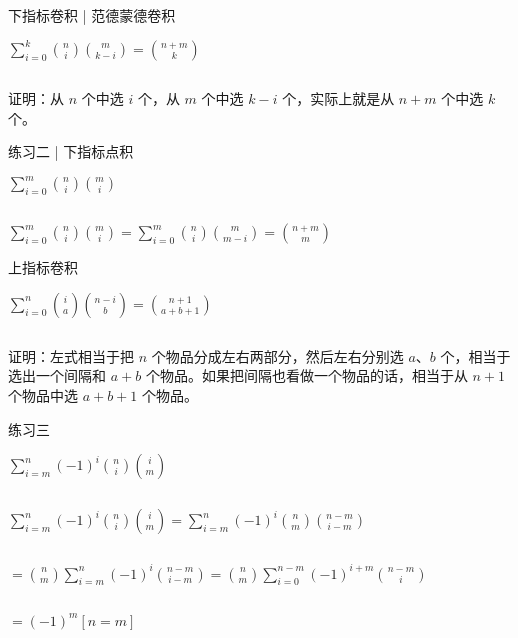 \documentclass{beamer}
\begin{document}
\begin{frame}{下指标卷积 | 范德蒙德卷积}

    $\sum\limits_{i = 0} ^{k} {\binom ni \binom m{k-i}} = \binom {n + m}k$

    $ $
    \pause

    证明：从 $n$ 个中选 $i$ 个，从 $m$ 个中选 $k - i$ 个，实际上就是从 $n + m$ 个中选 $k$ 个。
    
\end{frame}

\begin{frame}{练习二 | 下指标点积}

    $\sum\limits_{i=0}^m {\binom ni\binom mi}$

    $ $
    \pause

    $\sum\limits_{i = 0} ^m {\binom ni\binom mi} = \sum\limits_{i = 0}^m{\binom ni\binom m{m-i}} = \binom {n + m}{m}$

\end{frame}

\begin{frame}{上指标卷积}

    $\sum\limits_{i = 0} ^ n{\binom i a\binom {n-i} b} = \binom {n + 1}{a + b + 1}$

    $ $
    \pause

    证明：左式相当于把 $n$ 个物品分成左右两部分，然后左右分别选 $a$、$b$ 个，相当于选出一个间隔和 $a+b$ 个物品。如果把间隔也看做一个物品的话，相当于从 $n+1$ 个物品中选 $a+b+1$ 个物品。
    
\end{frame}

\begin{frame}{练习三}

    $\sum\limits_{i = m}^n{(-1)^i\binom ni \binom im}$

    $ $
    \pause

    $\sum\limits_{i = m} ^n{(-1)^i \binom ni \binom im} = \sum\limits_{i = m} ^n{(-1)^i\binom nm\binom {n - m} {i - m}}$ 
    
    $ $
    
    $ = \binom nm\sum\limits_{i = m}^{n} {(-1)^i\binom {n - m}{i - m}} = \binom nm \sum\limits_{i = 0} ^{n - m}{(-1)^{i + m}\binom{n - m} i} $ 

    $ $
    
    $= (-1)^m[n = m]$
    
\end{frame}
\end{document}
